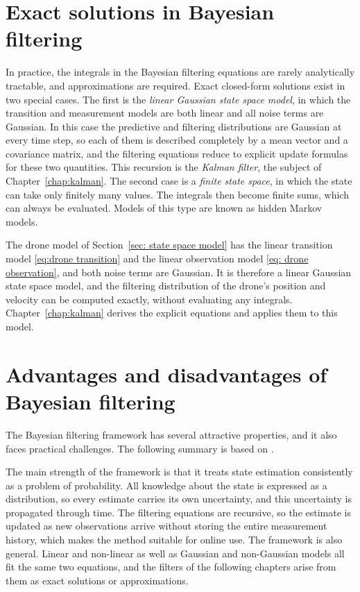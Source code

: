 \section{Exact solutions in Bayesian filtering}\label{sec: exact solutions in bayesian filtering}
In practice, the integrals in the Bayesian filtering equations are rarely analytically tractable, and approximations are required. Exact closed-form solutions exist in two special cases. The first is the \textit{linear Gaussian state space model}, in which the transition and measurement models are both linear and all noise terms are Gaussian. In this case the predictive and filtering distributions are Gaussian at every time step, so each of them is described completely by a mean vector and a covariance matrix, and the filtering equations reduce to explicit update formulas for these two quantities. This recursion is the \textit{Kalman filter}, the subject of Chapter~\ref{chap:kalman}. The second case is a \textit{finite state space}, in which the state can take only finitely many values. The integrals then become finite sums, which can always be evaluated. Models of this type are known as hidden Markov models.
 
\begin{example}\label{ex: drone exact solution}
The drone model of Section~\ref{sec: state space model} has the linear transition model \eqref{eq:drone transition} and the linear observation model \eqref{eq: drone observation}, and both noise terms are Gaussian. It is therefore a linear Gaussian state space model, and the filtering distribution of the drone's position and velocity can be computed exactly, without evaluating any integrals. Chapter~\ref{chap:kalman} derives the explicit equations and applies them to this model.
\end{example}

\section{Advantages and disadvantages of Bayesian filtering}
The Bayesian filtering framework has several attractive properties, and it also faces practical challenges. The following summary is based on \cite[Sections~1.4 and~2.2]{sarkka:bayesian_filtering}.

The main strength of the framework is that it treats state estimation consistently as a problem of probability. All knowledge about the state is expressed as a distribution, so every estimate carries its own uncertainty, and this uncertainty is propagated through time. The filtering equations are recursive, so the estimate is updated as new observations arrive without storing the entire measurement history, which makes the method suitable for online use. The framework is also general. Linear and non-linear as well as Gaussian and non-Gaussian models all fit the same two equations, and the filters of the following chapters arise from them as exact solutions or approximations.

